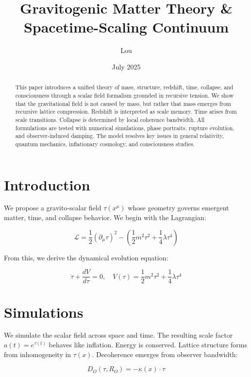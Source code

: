 \documentclass[12pt]{article}
\title{Gravitogenic Matter Theory & Spacetime-Scaling Continuum}
\author{Lou}
\date{July 2025}
\begin{document}
\maketitle

\begin{abstract}
This paper introduces a unified theory of mass, structure, redshift, time, collapse, and consciousness through a scalar field formalism grounded in recursive tension. We show that the gravitational field is not caused by mass, but rather that mass emerges from recursive lattice compression. Redshift is interpreted as scale memory. Time arises from scale transitions. Collapse is determined by local coherence bandwidth. All formulations are tested with numerical simulations, phase portraits, rupture evolution, and observer-induced damping. The model resolves key issues in general relativity, quantum mechanics, inflationary cosmology, and consciousness studies.
\end{abstract}

\section{Introduction}
We propose a gravito-scalar field $\tau(x^\mu)$ whose geometry governs emergent matter, time, and collapse behavior. We begin with the Lagrangian:

\begin{equation}
\mathcal{L} = \frac{1}{2}(\partial_\mu \tau)^2 - \left( \frac{1}{2} m^2 \tau^2 + \frac{1}{4} \lambda \tau^4 \right)
\end{equation}

From this, we derive the dynamical evolution equation:

\begin{equation}
\ddot{\tau} + \frac{dV}{d\tau} = 0, \quad V(\tau) = \frac{1}{2} m^2 \tau^2 + \frac{1}{4} \lambda \tau^4
\end{equation}

\section{Simulations}
We simulate the scalar field across space and time. The resulting scale factor $a(t) = e^{\tau(t)}$ behaves like inflation. Energy is conserved. Lattice structure forms from inhomogeneity in $\tau(x)$. Decoherence emerges from observer bandwidth:

\begin{equation}
D_O(\tau, R_O) = -\kappa(x) \cdot \tau
\end{equation}
\end{document}

